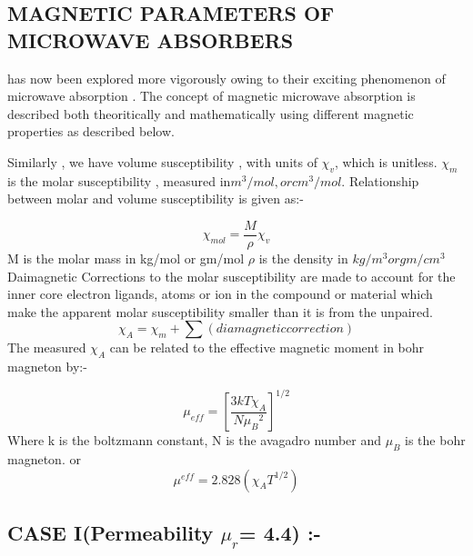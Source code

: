 \documentclass[journal]{IEEEtran}
\begin{document}
\begin{longtable}{|c|c|c|c|c|c|c|c|}
\end{longtable}

\begin{multicols}{2}


\section{MAGNETIC PARAMETERS OF MICROWAVE ABSORBERS}
 has now been explored more vigorously owing to their exciting phenomenon of microwave absorption \cite{Adi}. The concept of magnetic microwave absorption is described both theoritically and mathematically using different magnetic properties as described below.


Similarly , we have volume susceptibility , with units of $\chi_v$, which is unitless.
$\chi_m$ is the molar susceptibility , measured in$ m^3/mol , or cm^3/mol$. Relationship between molar and volume susceptibility is given as:-

\begin{equation}
{\chi}_{mol} = \dfrac{M}{\rho} \chi_v
\end{equation}
M is the molar mass in kg/mol or gm/mol
$\rho$ is the density in $ kg/m^3 or gm/cm^3$
Daimagnetic Corrections to the molar susceptibility are made to account for the inner core electron ligands, atoms or ion in the compound or material which make the apparent molar susceptibility smaller than it is from the unpaired.
\begin{equation}
\chi_A = \chi_m + \sum(diamagnetic correction)
\end{equation}
The measured $ \chi_A $ can be related to the effective magnetic moment in bohr magneton by:-

\begin{equation}
\mu_{eff} = {[\dfrac{3kT\chi_A}{N {\mu_B}^2}]}^{1/2}
\end{equation}
Where k is the boltzmann constant, N is the avagadro number and $ \mu_B $ is the bohr magneton.
or 
$$\mu^{eff} = 2.828 ({\chi_A T}^{1/2})$$


\subsection{CASE I(Permeability $\mu_r$= 4.4) :-}




\end{multicols}
\end{document}
